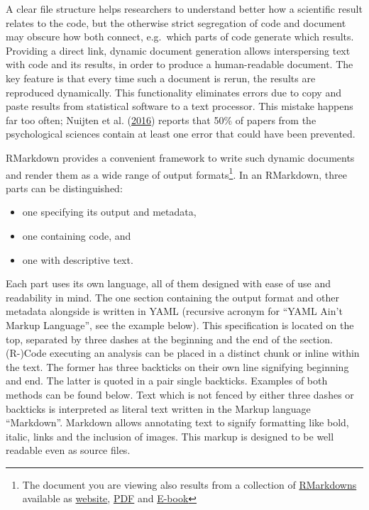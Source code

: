 \documentclass[12pt,a4paper,twoside]{article}
\providecommand{\tightlist}{%
  \setlength{\itemsep}{0pt}\setlength{\parskip}{0pt}}
\begin{document}
A clear file structure helps researchers to understand better how a scientific result relates to the code, but the otherwise strict segregation of code and document may obscure how both connect, e.g.~which parts of code generate which results.
Providing a direct link, dynamic document generation allows interspersing text with code and its results, in order to produce a human-readable document.
The key feature is that every time such a document is rerun, the results are reproduced dynamically.
This functionality eliminates errors due to copy and paste results from statistical software to a text processor. This mistake happens far too often; Nuijten et al. (\protect\hyperlink{ref-nuijtenPrevalenceStatisticalReporting2016}{2016}) reports that 50\% of papers from the psychological sciences contain at least one error that could have been prevented.

RMarkdown provides a convenient framework to write such dynamic documents and render them as a wide range of output formats\footnote{The document you are viewing also results from a collection of \href{https://github.com/aaronpeikert/repro-thesis}{RMarkdowns} available as \href{https://aaronpeikert.github.io/repro-thesis/}{website}, \href{https://aaronpeikert.github.io/repro-thesis/ma.pdf}{PDF} and \href{https://aaronpeikert.github.io/repro-thesis/ma.epub}{E-book}}. In an RMarkdown, three parts can be distinguished:

\begin{itemize}
\tightlist
\item
  one specifying its output and metadata,
\item
  one containing code, and
\item
  one with descriptive text.
\end{itemize}

Each part uses its own language, all of them designed with ease of use and readability in mind.
The one section containing the output format and other metadata alongside is written in YAML (recursive acronym for ``YAML Ain't Markup Language'', see the example below).
This specification is located on the top, separated by three dashes at the beginning and the end of the section.
(R-)Code executing an analysis can be placed in a distinct chunk or inline within the text.
The former has three backticks on their own line signifying beginning and end.
The latter is quoted in a pair single backticks.
Examples of both methods can be found below.
Text which is not fenced by either three dashes or backticks is interpreted as literal text written in the Markup language ``Markdown''.
Markdown allows annotating text to signify formatting like bold, italic, links and the inclusion of images.
This markup is designed to be well readable even as source files.
\end{document}
